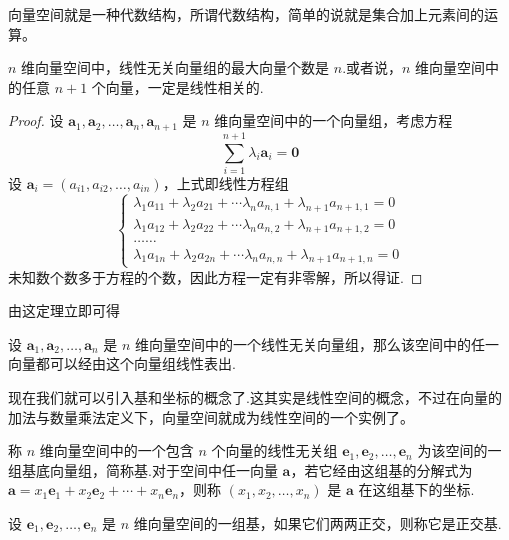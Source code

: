 向量空间就是一种代数结构，所谓代数结构，简单的说就是集合加上元素间的运算。

\begin{theorem}
  $n$ 维向量空间中，线性无关向量组的最大向量个数是
  $n$.或者说，$n$ 维向量空间中的任意 $n + 1$
  个向量，一定是线性相关的.
\end{theorem}

\begin{proof}
  设 $\bm{a}_1, \bm{a}_2, \ldots, \bm{a}_n, \bm{a}_{n
  + 1}$ 是 $n$ 维向量空间中的一个向量组，考虑方程
  \[ \sum_{i = 1}^{n + 1} \lambda_i \bm{a}_i =\bm{0} \]
  设 $\bm{a}_i = (a_{i 1}, a_{i 2}, \ldots, a_{i
  n})$，上式即线性方程组
  \[ \left\{ \begin{array}{l}
       \lambda_1 a_{11} + \lambda_2 a_{21} + \cdots \lambda_n a_{n, 1} +
       \lambda_{n + 1} a_{n + 1, 1} = 0\\
       \lambda_1 a_{12} + \lambda_2 a_{22} + \cdots \lambda_n a_{n, 2} +
       \lambda_{n + 1} a_{n + 1, 2} = 0\\
       \ldots \ldots\\
       \lambda_1 a_{1 n} + \lambda_2 a_{2 n} + \cdots \lambda_n a_{n, n} +
       \lambda_{n + 1} a_{n + 1, n} = 0
     \end{array} \right. \]
  未知数个数多于方程的个数，因此方程一定有非零解，所以得证.
\end{proof}

由这定理立即可得

\begin{theorem}
  设 $\bm{a}_1, \bm{a}_2, \ldots, \bm{a}_n$ 是 $n$
  维向量空间中的一个线性无关向量组，那么该空间中的任一向量都可以经由这个向量组线性表出.
\end{theorem}


现在我们就可以引入基和坐标的概念了.这其实是线性空间的概念，不过在向量的加法与数量乘法定义下，向量空间就成为线性空间的一个实例了。

\begin{definition}
  称 $n$ 维向量空间中的一个包含 $n$ 个向量的线性无关组
  $\bm{e}_1, \bm{e}_2, \ldots, \bm{e}_n$
  为该空间的一组基底向量组，简称基.对于空间中任一向量
  $\bm{a}$，若它经由这组基的分解式为 $\bm{a}= x_1
  \bm{e}_1 + x_2 \bm{e}_2 + \cdots + x_n \bm{e}_n$，则称
  $(x_1, x_2, \ldots, x_n)$ 是 $\bm{a}$ 在这组基下的坐标.
\end{definition}

\begin{definition}
  设 $\bm{e}_1, \bm{e}_2, \ldots, \bm{e}_n$ 是 $n$
  维向量空间的一组基，如果它们两两正交，则称它是正交基.
\end{definition}

